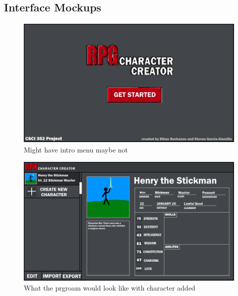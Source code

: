 \documentclass[10pt,conference,onecolumn,compsoc]{IEEEtran}
\begin{document}
\subsection{Interface Mockups}

\begin{figure}[H]
\includegraphics[height=240px, width=426px]{CSCI 352 Interface Mockups/Interface Mockup 0.png}
\caption{Might have intro menu maybe not}
\centering
\end{figure}

\begin{figure}[H]
\includegraphics[height=240px, width=426px]{CSCI 352 Interface Mockups/Interface Mockup 1.png}
\caption{What the prgroam would look like with character added}
\centering
\end{figure}
\end{document}
